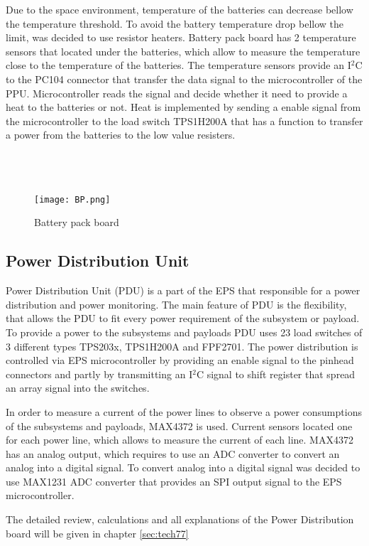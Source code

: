   Due to the space environment, temperature of the batteries can decrease bellow the temperature threshold. To avoid the battery temperature drop bellow the limit, was decided to use resistor heaters. Battery pack board has 2 temperature sensors that located under the batteries, which allow to measure the temperature close to the temperature of the batteries. The temperature sensors provide an I$^{2}$C to the PC104 connector that transfer the data signal to the microcontroller of the PPU. Microcontroller reads the signal and decide whether it need to provide a heat to the batteries or not. Heat is implemented by sending a enable signal from the microcontroller to the load switch TPS1H200A that has a function to transfer a power from the batteries to the low value resisters.  \\ \\ \\ \\
  
  
  \begin{figure}[h]
  	\centering
  	\texttt{[image: BP.png]}
  	\caption{Battery pack board}
  	\label{fig: BP}
  \end{figure} 
   
  
  \subsection{Power Distribution Unit}
  Power Distribution Unit (PDU) is a part of the EPS that responsible for a power distribution and power monitoring. The main feature of PDU is the flexibility, that allows the PDU to fit every power requirement of the subsystem or payload.     To provide a power to the subsystems and payloads PDU uses 23 load switches of 3 different types TPS203x, TPS1H200A and FPF2701. The power distribution is controlled via EPS microcontroller by providing an enable signal to the pinhead connectors and partly by transmitting an I$^2$C signal to shift register that spread an array signal into the switches. 
  
  In order to measure a current of the power lines to observe a power consumptions of the subsystems and payloads, MAX4372 is used. Current sensors located one for each power line, which allows to measure the current of each line. MAX4372 has an analog output, which requires to use an ADC converter to convert an analog into a digital signal. To convert analog into a digital signal was decided to use MAX1231 ADC converter that provides an SPI output signal to the EPS microcontroller. 
  
    
  The detailed review, calculations and all explanations of the Power Distribution board will be given in chapter \ref{sec:tech77}
  
    
  
    

    
  

  
  
  

